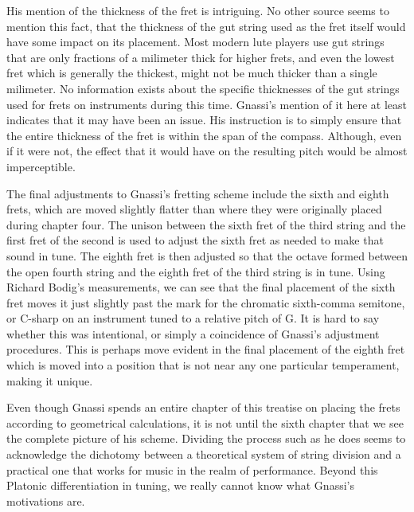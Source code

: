 His mention of the thickness of the fret is intriguing.  No other source seems to mention
this fact, that the thickness of the gut string used as the fret itself would have some
impact on its placement.  Most modern lute players use gut strings that are only
fractions of a milimeter thick for higher frets, and even the lowest fret which is generally
the thickest, might not be much thicker than a single milimeter.  No information exists
about the specific thicknesses of the gut strings used for frets on instruments during this
time.  Gnassi's mention of it here at least indicates that it may have been an issue.  His
instruction is to simply ensure that the entire thickness of the fret is within the span of the
compass.  Although, even if it were not, the effect that it would have on the resulting pitch
would be almost imperceptible.

The final adjustments to Gnassi's fretting scheme include the sixth and eighth frets, which are
moved slightly flatter than where they were originally placed during chapter four.
The unison between the sixth fret of the third string
and the first fret of the second is used to adjust the sixth fret as needed to make that sound
in tune.  The eighth fret is then adjusted so that the octave formed between the open fourth
string and the eighth fret of the third string is in tune.  Using Richard Bodig's measurements,
we can see that the final placement of the sixth
fret moves it just slightly past the mark for the chromatic sixth-comma semitone, or C-sharp on
an instrument tuned to a relative pitch of G.  It is hard to say whether this was intentional,
or simply a coincidence of Gnassi's adjustment procedures.  This is perhaps move evident in the
final placement of the eighth fret which is moved into a position that is not near any one
particular temperament, making it unique.





Even though Gnassi spends an entire chapter of this treatise on placing the
frets according to geometrical calculations, it is not until the sixth
chapter that we see the complete picture of his scheme.  Dividing the process
such as he does seems to acknowledge the dichotomy between a
theoretical system of string division and a practical one that works for music in the
realm of performance.  Beyond this Platonic differentiation in tuning, we really cannot know
what Gnassi's motivations are.

